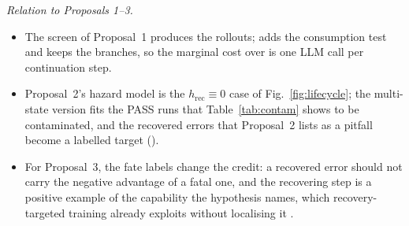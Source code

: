 \documentclass[10pt,a4paper]{article}
\begin{document}
\emph{Relation to Proposals 1--3.}
\begin{itemize}[leftmargin=1.1em]
\item The screen of Proposal~1 produces the rollouts;  adds the consumption test and keeps the branches, so the marginal cost over  is one LLM call per continuation step.
\item Proposal~2's hazard model is the $h_{\mathrm{rec}}\equiv0$ case of Fig.~\ref{fig:lifecycle}; the multi-state version fits the PASS runs that Table~\ref{tab:contam} shows to be contaminated, and the recovered errors that Proposal~2 lists as a pitfall become a labelled target ().
\item For Proposal~3, the fate labels change the credit: a recovered error should not carry the negative advantage of a fatal one, and the recovering step is a positive example of the capability the hypothesis names, which recovery-targeted training already exploits without localising it \cite{cuarecovery2026,reterm2026}.
\end{itemize}
\end{document}
